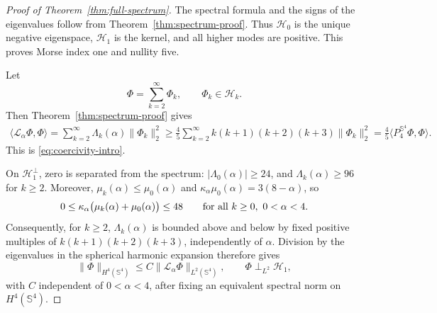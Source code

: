 \documentclass[11pt]{article}
\numberwithin{equation}{section}
\begin{document}
\begin{proof}[Proof of Theorem~\ref{thm:full-spectrum}]
The spectral formula and the signs of the eigenvalues follow from Theorem~\ref{thm:spectrum-proof}. Thus \(\mathcal H_{0}\) is the unique negative eigenspace, \(\mathcal H_{1}\) is the kernel, and all higher modes are positive. This proves Morse index one and nullity five.

Let
\[
\Phi=\sum_{k=2}^{\infty}\Phi_{k},
\qquad \Phi_{k}\in\mathcal H_{k}.
\]
Then Theorem~\ref{thm:spectrum-proof} gives
\[
\begin{aligned}
\langle\mathcal L_{\alpha}\Phi,\Phi\rangle
=\sum_{k=2}^{\infty}
\Lambda_{k}(\alpha)\|\Phi_{k}\|_{2}^{2}\geq\frac45
\sum_{k=2}^{\infty}
k(k+1)(k+2)(k+3)\|\Phi_{k}\|_{2}^{2}=\frac45
\langle P_{4}^{\mathbb S^{4}}\Phi,\Phi\rangle.
\end{aligned}
\]
This is \eqref{eq:coercivity-intro}.

On \(\mathcal H_{1}^{\perp}\), zero is separated from the spectrum:
\(|\Lambda_{0}(\alpha)|\geq24\), and
\(\Lambda_{k}(\alpha)\geq96\) for \(k\geq2\). Moreover,
\(\mu_k(\alpha)\leq\mu_0(\alpha)\) and
\(\kappa_\alpha\mu_0(\alpha)=3(8-\alpha)\), so
\[
0\leq\kappa_\alpha\bigl(\mu_k(\alpha)+\mu_0(\alpha)\bigr)
\leq48
\qquad\hbox{for all }k\geq0,\ 0<\alpha<4.
\]
Consequently, for \(k\geq2\), \(\Lambda_k(\alpha)\) is bounded above and below
by fixed positive multiples of
\(k(k+1)(k+2)(k+3)\), independently of \(\alpha\). Division by the
eigenvalues in the spherical harmonic expansion therefore gives
\[
\|\Phi\|_{H^{4}(\mathbb S^{4})}
\leq C\|\mathcal L_{\alpha}\Phi\|_{L^{2}(\mathbb S^{4})},
\qquad \Phi\perp_{L^{2}}\mathcal H_{1},
\]
with \(C\) independent of \(0<\alpha<4\), after fixing an equivalent spectral
norm on \(H^{4}(\mathbb S^{4})\).
\end{proof}
\end{document}

